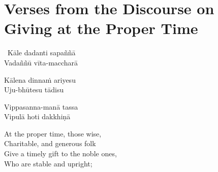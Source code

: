 \suttaRef{[AN 5.32]}

\clearpage



\section{Verses from the Discourse on Giving at the Proper Time}
\label{giving-at-proper-time}

\begin{pali-hang-together}
  \anglebracketleft\ \hspace{-0.5mm}Kāle dadanti sapaññā \hspace{-0.5mm}\anglebracketright\ \\
  Vadaññū vīta-maccharā
\end{pali-hang-together}
\begin{pali-hang-together}
  Kālena dinnaṁ ariyesu\\
  Uju-bhūtesu tādisu
\end{pali-hang-together}
\begin{pali-hang-together}
  Vippasanna-manā tassa\\
  Vipulā hoti dakkhiṇā
\end{pali-hang-together}


\begin{english-verses}
  At the proper time, those wise,\\
  Charitable, and generous folk\\
  Give a timely gift to the noble ones,\\
  Who are stable and upright;
\end{english-verses}

